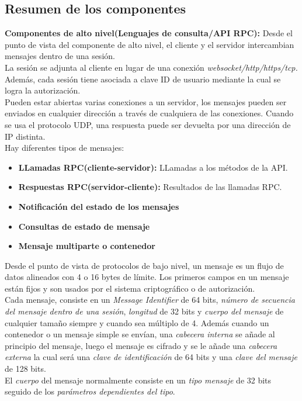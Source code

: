 \subsection{Resumen de los componentes}
\begin{description}
	\item \textbf{Componentes de alto nivel(Lenguajes de consulta/API RPC):}
Desde el punto de vista del componente de alto nivel, el cliente y el servidor intercambian mensajes dentro de una sesión.\\
La sesión se adjunta al cliente en lugar de una conexión \emph{websocket/http/https/tcp.} 
Además, cada sesión tiene asociada a clave ID de usuario mediante la cual se logra la autorización.\\ 
Pueden estar abiertas varias conexiones a un servidor, los mensajes pueden ser enviados en cualquier dirección a través de cualquiera de las conexiones.
Cuando se usa el protocolo UDP, una respuesta puede ser devuelta por una dirección de IP distinta.\\
Hay diferentes tipos de mensajes:
\begin{itemize}
		\item \textbf{LLamadas RPC(cliente-servidor):} LLamadas a los métodos de la API.
		\item \textbf{Respuestas RPC(servidor-cliente):} Resultados de las llamadas RPC.
		\item \textbf{Notificación del estado de los mensajes}
		\item \textbf{Consultas de estado de mensaje}
		\item \textbf{Mensaje multiparte o contenedor}
\end{itemize}
Desde el punto de vista de protocolos de bajo nivel, un mensaje es un flujo de datos alineados con 4 o 16 bytes de límite.
Los primeros campos en un mensaje están fijos y son usados por el sistema criptográfico o de autorización.\\
Cada mensaje, consiste en un \emph{Message Identifier} de 64 bits, \emph{número de secuencia del mensaje dentro de una sesión}, \emph{longitud} de 32 bits y \emph{cuerpo del mensaje} de cualquier tamaño siempre y cuando sea múltiplo de 4. 
Además cuando un contenedor o un mensaje simple se envían, una \emph{cabecera interna} se añade al principio del mensaje, luego el mensaje es cifrado y se le añade una \emph{cabecera externa} la cual será una \emph{clave de identificación} de 64 bits y una \emph{clave del mensaje} de 128 bits.\\
El \emph{cuerpo} del mensaje normalmente consiste en un \emph{tipo mensaje} de 32 bits seguido de los \emph{parámetros dependientes del tipo}.\\

\end{description}
